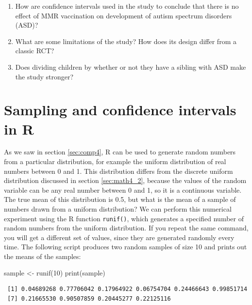 \documentclass[
  letterpaper,
  DIV=11,
  numbers=noendperiod]{scrreprt}
\newenvironment{Shaded}{\begin{snugshade}}{\end{snugshade}}
\newcommand{\DecValTok}[1]{\textcolor[rgb]{0.68,0.00,0.00}{#1}}
\newcommand{\FunctionTok}[1]{\textcolor[rgb]{0.28,0.35,0.67}{#1}}
\newcommand{\NormalTok}[1]{\textcolor[rgb]{0.00,0.23,0.31}{#1}}
\newcommand{\OtherTok}[1]{\textcolor[rgb]{0.00,0.23,0.31}{#1}}
\begin{document}
\begin{enumerate}
\def\labelenumi{\arabic{enumi}.}
\item
  How are confidence intervals used in the study to conclude that there
  is no effect of MMR vaccination on development of autism spectrum
  disorders (ASD)?
\item
  What are some limitations of the study? How does its design differ
  from a classic RCT?
\item
  Does dividing children by whether or not they have a sibling with ASD
  make the study stronger?
\end{enumerate}

\hypertarget{sampling-and-confidence-intervals-in-r}{%
\section{Sampling and confidence intervals in
R}\label{sampling-and-confidence-intervals-in-r}}

As we saw in section \ref{sec:comp4}, R can be used to generate random
numbers from a particular distribution, for example the uniform
distribution of real numbers between 0 and 1. This distribution differs
from the discrete uniform distribution discussed in section
\ref{sec:math4_2}, because the values of the random variable can be any
real number between 0 and 1, so it is a continuous variable. The true
mean of this distribution is 0.5, but what is the mean of a sample of
numbers drawn from a uniform distribution? We can perform this numerical
experiment using the R function \texttt{runif()}, which generates a
specified number of random numbers from the uniform distribution. If you
repeat the same command, you will get a different set of values, since
they are generated randomly every time. The following script produces
two random samples of size 10 and prints out the means of the samples:

\begin{Shaded}
\begin{Highlighting}[]
\NormalTok{sample }\OtherTok{\textless{}{-}} \FunctionTok{runif}\NormalTok{(}\DecValTok{10}\NormalTok{)}
\FunctionTok{print}\NormalTok{(sample)}
\end{Highlighting}
\end{Shaded}

\begin{verbatim}
 [1] 0.04689268 0.77706042 0.17964922 0.06754704 0.24466643 0.99851714
 [7] 0.21665530 0.90507859 0.20445277 0.22125116
\end{verbatim}
\end{document}
